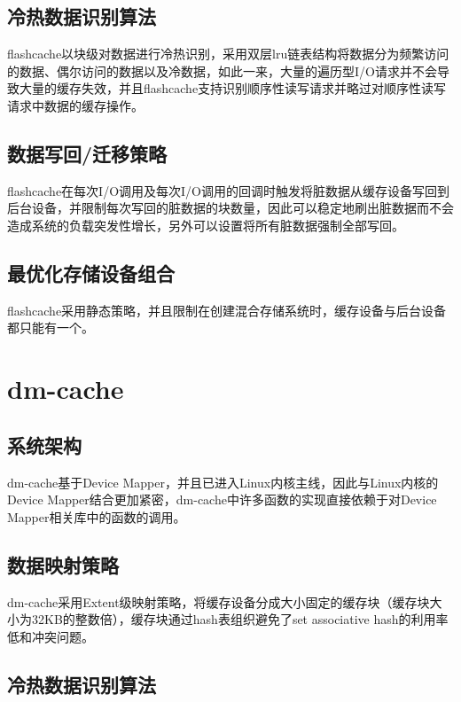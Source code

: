 \subsection{冷热数据识别算法}

flashcache以块级对数据进行冷热识别，采用双层lru链表结构将数据分为频繁访问的数据、偶尔访问的数据以及冷数据，如此一来，大量的遍历型I/O请求并不会导致大量的缓存失效，并且flashcache支持识别顺序性读写请求并略过对顺序性读写请求中数据的缓存操作。

\subsection{数据写回/迁移策略}

flashcache在每次I/O调用及每次I/O调用的回调时触发将脏数据从缓存设备写回到后台设备，并限制每次写回的脏数据的块数量，因此可以稳定地刷出脏数据而不会造成系统的负载突发性增长，另外可以设置将所有脏数据强制全部写回。

\subsection{最优化存储设备组合}

flashcache采用静态策略，并且限制在创建混合存储系统时，缓存设备与后台设备都只能有一个。

\section{dm-cache}

\subsection{系统架构}

dm-cache基于Device Mapper，并且已进入Linux内核主线，因此与Linux内核的Device Mapper结合更加紧密，dm-cache中许多函数的实现直接依赖于对Device Mapper相关库中的函数的调用。

\subsection{数据映射策略}

dm-cache采用Extent级映射策略，将缓存设备分成大小固定的缓存块（缓存块大小为32KB的整数倍），缓存块通过hash表组织避免了set associative hash的利用率低和冲突问题。

\subsection{冷热数据识别算法}

